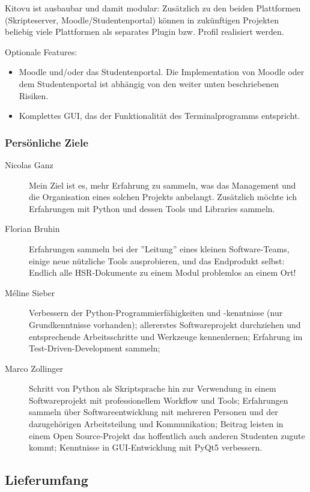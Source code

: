 \documentclass[a4paper]{article}
\begin{document}
Kitovu ist ausbaubar und damit modular: Zusätzlich zu den beiden Plattformen (Skripteserver, Moodle/Studentenportal) können in zukünftigen Projekten beliebig viele Plattformen als separates Plugin bzw. Profil realisiert werden.

Optionale Features:

\begin{itemize}
  \item Moodle und/oder das Studentenportal. Die Implementation von Moodle oder dem Studentenportal ist abhängig von den weiter unten beschriebenen Risiken.
  \item Komplettes GUI, das der Funktionalität des Terminalprogramms entspricht.
\end{itemize}

\subsubsection{Persönliche Ziele}
\begin{description}
\item[Nicolas Ganz]
  Mein Ziel ist es, mehr Erfahrung zu sammeln, was das Management und die Organisation eines solchen Projekts anbelangt.
  Zusätzlich möchte ich Erfahrungen mit Python und dessen Tools und Libraries sammeln.
\item[Florian Bruhin] Erfahrungen sammeln bei der ''Leitung'' eines kleinen
  Software-Teams, einige neue nützliche Tools ausprobieren, und das Endprodukt
  selbst: Endlich alle HSR-Dokumente zu einem Modul problemlos an einem Ort!
\item[Méline Sieber] Verbessern der Python-Programmierfähigkeiten und -kenntnisse (nur Grundkenntnisse vorhanden); allererstes Softwareprojekt durchziehen und entsprechende Arbeitsschritte und Werkzeuge kennenlernen; Erfahrung im Test-Driven-Development sammeln; 
\item[Marco Zollinger] Schritt von Python als Skriptsprache hin zur Verwendung in einem Softwareprojekt mit professionellem Workflow und Tools; Erfahrungen sammeln über Softwareentwicklung mit mehreren Personen und der dazugehörigen Arbeitsteilung und Kommunikation; Beitrag leisten in einem Open Source-Projekt das hoffentlich auch anderen Studenten zugute kommt; Kenntnisse in GUI-Entwicklung mit PyQt5 verbessern.

\end{description}

\subsection{Lieferumfang}
\end{document}

